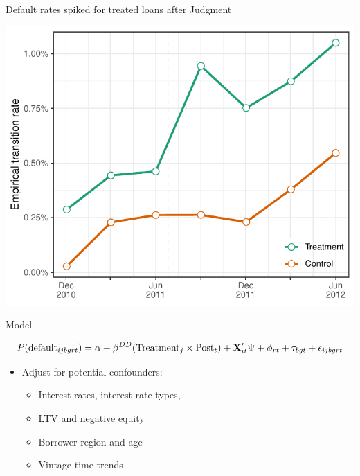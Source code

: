 \documentclass[ignorenonframetext,aspectratio=169]{beamer}
\providecommand{\tightlist}{%
  \setlength{\itemsep}{0pt}\setlength{\parskip}{0pt}}
\begin{document}
\begin{frame}{Default rates spiked for treated loans after Judgment}

\centering\includegraphics[width=0.75\linewidth]{transitions.pdf}

\end{frame}

\begin{frame}{Model}

\[ P(\textup{{default}}_{ijbgrt})=\alpha+\beta^{DD}(\textup{{Treatment}}_{j}\times\textup{Post}_{t})+\mathbf{X}_{it}^{\prime}\Psi+\phi_{rt}+\tau_{bgt}+\epsilon_{ijbgrt}\]

\begin{itemize}
\tightlist
\item
  Adjust for potential confounders:

  \begin{itemize}
  \tightlist
  \item
    Interest rates, interest rate types,
  \item
    LTV and negative equity
  \item
    Borrower region and age
  \item
    Vintage time trends
  \end{itemize}
\end{itemize}

\end{frame}

\begin{frame}{}

\centering

\end{frame}
\end{document}
